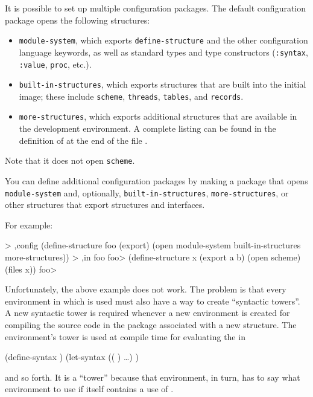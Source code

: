 It is possible to set up multiple configuration packages.  The default
configuration package opens the following structures:
\begin{itemize}
\item {\tt module-system}, which exports {\tt define-structure} and the
      other configuration language keywords, as well as standard types
      and type constructors ({\tt :syntax}, {\tt :value}, {\tt proc}, etc.).
\item {\tt built-in-structures}, which exports structures that are
      built into the initial \hack{} image; these include
      {\tt scheme}, {\tt threads}, {\tt tables}, and {\tt records}.
\item {\tt more-structures}, which exports additional structures that
      are available in the development environment. 
      A complete listing
      can be found in the definition of 
      at the end of the file .
\end{itemize}
Note that it does not open {\tt scheme}.

You can define additional configuration packages by making a package
 that opens {\tt module-\ok{}system} and, optionally,
 {\tt built-in-\ok{}structures},
 {\tt more-\ok{}structures}, or other structures that
 export structures and interfaces.

For example:
\begin{example}
> ,config (define-structure foo (export)
            (open module-system
                  built-in-structures
                  more-structures))
> ,in foo
foo> (define-structure x (export a b)
       (open scheme)
       (files x))
foo> 
\end{example}

Unfortunately, the above example does not work.
The problem is that every environment in which
  is used must also have a way to
 create ``syntactic towers''.
A new syntactic tower is required whenever a new environment is created for
 compiling the source code in the package associated with a new structure.
The environment's tower is used at compile time for
 evaluating the  in
\begin{example}
(define-syntax  )
(let-syntax (( ) \ldots) )
\end{example}
 and so forth.
It is a ``tower'' because that environment, in turn, has to say what environment
 to use if  itself contains a use of .

